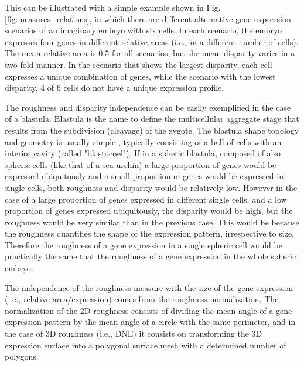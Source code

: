 This can be illustrated with a simple example shown in Fig. \ref{fig:measures_relations}, in which there are different alternative gene expression scenarios of an imaginary embryo with six cells. In each scenario, the embryo expresses four genes in different relative areas (i.e., in a different number of cells). The mean relative area is 0.5 for all scenarios, but the mean disparity varies in a two-fold manner. In the scenario that shows the largest disparity, each cell expresses a unique combination of genes, while the scenario with the lowest disparity, 4 of 6 cells do not have a unique expression profile.

The roughness and disparity independence can be easily exemplified in the case of a blastula. Blastula is the name to define the multicellular aggregate stage that results from the subdivision (cleavage) of the zygote. The blastula shape topology and geometry is usually simple \citep{Forgacs_Newman2005}, typically consisting of a ball of cells with an interior cavity (called "blastocoel"). If in a spheric blastula, composed of also spheric cells (like that of a sea urchin) a large proportion of genes would be expressed ubiquitously and a small proportion of genes would be expressed in single cells, both roughness and disparity would be relatively low.
However in the case of a large proportion of genes expressed in different single cells, and a low proportion of genes expressed ubiquitously, the disparity would be high, but the roughness would be very similar than in the previous case. This would be because the roughness quantifies the shape of the expression pattern, irrespective to size. Therefore the roughness of a gene expression in a single spheric cell would be practically the same that the roughness of a gene expression in the whole spheric embryo.

The independence of the roughness measure with the size of the gene expression (i.e., relative area/expression) comes from the roughness normalization. The normalization of the 2D roughness consists of dividing the mean angle of a gene expression pattern by the mean angle of a circle with the same perimeter, and in the case of 3D roughness (i.e., DNE) it consists on transforming the 3D expression surface into a polygonal surface mesh with a determined number of polygons. 


